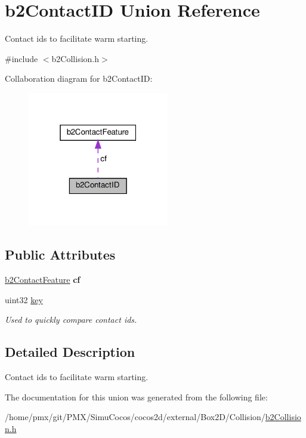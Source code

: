 \hypertarget{unionb2ContactID}{}\section{b2\+Contact\+ID Union Reference}
\label{unionb2ContactID}


Contact ids to facilitate warm starting.  




{\ttfamily \#include $<$b2\+Collision.\+h$>$}



Collaboration diagram for b2\+Contact\+ID\+:
\nopagebreak
\begin{figure}[H]
\begin{center}
\leavevmode
\includegraphics[width=175pt]{unionb2ContactID__coll__graph}
\end{center}
\end{figure}
\subsection*{Public Attributes}
\begin{DoxyCompactItemize}
\item 
\mbox{\label{unionb2ContactID_a58b6732f909bc760f75e7aff3cd4be08}} 
\hyperlink{structb2ContactFeature}{b2\+Contact\+Feature} {\bfseries cf}
\item 
\mbox{\label{unionb2ContactID_a04c04f8fdcb799b33552d01b3aa3f245}} 
uint32 \hyperlink{unionb2ContactID_a04c04f8fdcb799b33552d01b3aa3f245}{key}
\begin{DoxyCompactList}\small\item\em Used to quickly compare contact ids. \end{DoxyCompactList}\end{DoxyCompactItemize}


\subsection{Detailed Description}
Contact ids to facilitate warm starting. 

The documentation for this union was generated from the following file\+:\begin{DoxyCompactItemize}
\item 
/home/pmx/git/\+P\+M\+X/\+Simu\+Cocos/cocos2d/external/\+Box2\+D/\+Collision/\hyperlink{cocos2d_2external_2Box2D_2Collision_2b2Collision_8h}{b2\+Collision.\+h}\end{DoxyCompactItemize}
